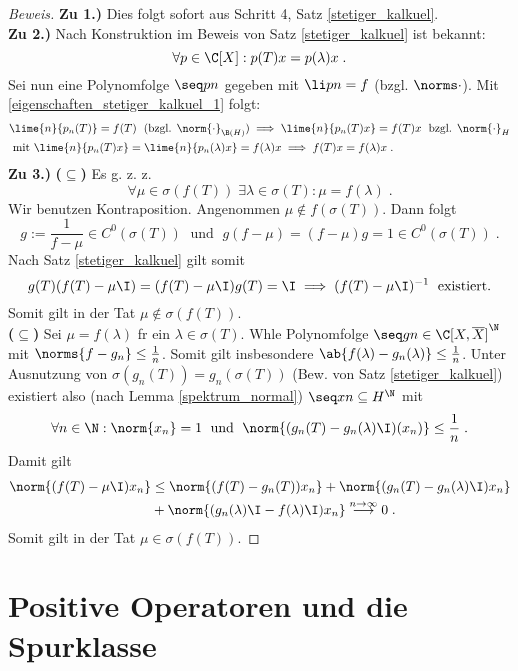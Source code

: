 	\begin{proof}[Beweis]
		\textbf{Zu 1.)} Dies folgt sofort aus Schritt 4, Satz \ref{stetiger_kalkuel}.\\
		\textbf{Zu 2.)} Nach Konstruktion im Beweis von Satz \ref{stetiger_kalkuel} ist bekannt:
		\[\forall p \in \C[X]: p(T)x = p(\lambda)x\;.\]
		Sei nun eine Polynomfolge \(\seq pn\) gegeben mit \(\li pn = f\) (bzgl. \(\norms\cdot\)). Mit \ref{eigenschaften_stetiger_kalkuel_1} folgt:
		\begin{align*}
		&\lime{n}{p_n(T)} = f(T)\;\text{ (bzgl. $\norm{\cdot}_{\B(H)}$)} \implies \lime{n}{p_n(T)x} = f(T)x \;\text{ bzgl. $\norm{\cdot}_{H}$} \\
		& \text{ mit }\lime{n}{p_n(T)x} = \lime{n}{p_n(\lambda)x} = f(\lambda)x \implies f(T)x = f(\lambda)x\;.
		\end{align*}
		\textbf{Zu 3.)} \textbf{($\subseteq$)} Es g. z. z. 
		\[\forall \mu \in \sigma(f(T)) \;\exists \lambda \in \sigma(T): \mu = f(\lambda)\;.\]
		Wir benutzen Kontraposition. Angenommen \(\mu \not\in f(\sigma(T))\). Dann folgt
		\[g := \frac{1}{f-\mu} \in C^0(\sigma(T)) \;\text{ und }\; g(f-\mu) = (f-\mu)g = 1 \in C^0(\sigma(T))\;.\]
		Nach Satz \ref{stetiger_kalkuel} gilt somit
		\[g(T)(f(T) -\mu\I) = (f(T) -\mu\I)g(T) = \I \implies (f(T) -\mu\I)^{-1}\;\text{ existiert.}\]
		Somit gilt in der Tat \(\mu\not\in \sigma(f(T))\).\\
		\textbf{($\subseteq$)} Sei \(\mu = f(\lambda)\) f\us r ein \(\lambda \in \sigma(T)\). W\as hle Polynomfolge \(\seq gn \in \C[X,\overline X]^\N\) mit \(\norms{f - g_n} \leq \frac1n\). Somit gilt insbesondere \(\ab{f(\lambda) - g_n(\lambda)} \leq \frac 1n\). Unter Ausnutzung von \(\sigma(g_n(T)) = g_n(\sigma(T))\) (Bew. von Satz \ref{stetiger_kalkuel}) existiert also (nach Lemma \ref{spektrum_normal}) \(\seq xn \subseteq H^\N\) mit 
		\[\forall n\in\N: \norm{x_n} = 1 \;\text{ und } \; \norm{(g_n(T) - g_n(\lambda)\I)(x_n)}\leq \frac 1n\;.\]
		Damit gilt
		\begin{align*}
			\norm{(f(T) -\mu\I) x_n} &\leq \norm{(f(T) - g_n(T))x_n} + \norm{(g_n(T) - g_n(\lambda)\I)x_n} \\
			&+ \norm{(g_n(\lambda)\I - f(\lambda)\I)x_n} \overset{n\to\infty}{\longrightarrow} 0\;.
			\end{align*}
			Somit gilt in der Tat \(\mu\in\sigma(f(T))\).
	\end{proof}
	
	\section{Positive Operatoren und die Spurklasse}
	
